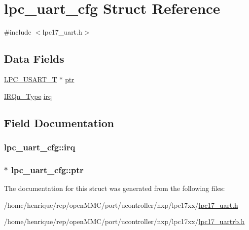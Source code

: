 \hypertarget{structlpc__uart__cfg}{\section{lpc\-\_\-uart\-\_\-cfg Struct Reference}
\label{structlpc__uart__cfg}
}


{\ttfamily \#include $<$lpc17\-\_\-uart.\-h$>$}

\subsection*{Data Fields}
\begin{DoxyCompactItemize}
\item 
\hyperlink{structLPC__USART__T}{L\-P\-C\-\_\-\-U\-S\-A\-R\-T\-\_\-\-T} $\ast$ \hyperlink{structlpc__uart__cfg_a6b2f09088b28aa15c0a0553572b94f19}{ptr}
\item 
\hyperlink{group__CMSIS__175X__6X__IRQ_gaaaeafe7bd8401a46d55e8431b6326116}{I\-R\-Qn\-\_\-\-Type} \hyperlink{structlpc__uart__cfg_a610c965ddf2c96776904e2401d96fd83}{irq}
\end{DoxyCompactItemize}


\subsection{Field Documentation}
\hypertarget{structlpc__uart__cfg_a610c965ddf2c96776904e2401d96fd83}{
\subsubsection[{irq}]{ lpc\-\_\-uart\-\_\-cfg\-::irq}}\label{structlpc__uart__cfg_a610c965ddf2c96776904e2401d96fd83}
\hypertarget{structlpc__uart__cfg_a6b2f09088b28aa15c0a0553572b94f19}{
\subsubsection[{ptr}]{ $\ast$ lpc\-\_\-uart\-\_\-cfg\-::ptr}}\label{structlpc__uart__cfg_a6b2f09088b28aa15c0a0553572b94f19}


The documentation for this struct was generated from the following files\-:\begin{DoxyCompactItemize}
\item 
/home/henrique/rep/open\-M\-M\-C/port/ucontroller/nxp/lpc17xx/\hyperlink{lpc17__uart_8h}{lpc17\-\_\-uart.\-h}\item 
/home/henrique/rep/open\-M\-M\-C/port/ucontroller/nxp/lpc17xx/\hyperlink{lpc17__uartrb_8h}{lpc17\-\_\-uartrb.\-h}\end{DoxyCompactItemize}
